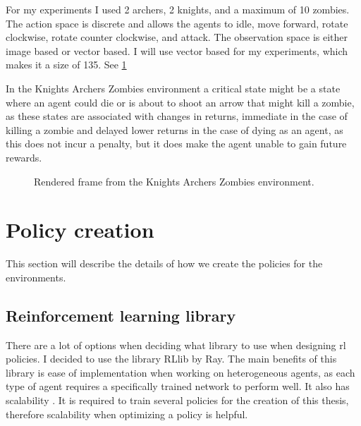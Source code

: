 \documentclass[UKenglish]{uiomasterthesis}
\begin{document}
For my experiments I used 2 archers, 2 knights, and a maximum of 10 zombies. The action space is discrete and allows the agents to idle, move forward, rotate clockwise, rotate counter clockwise, and attack. The observation space is either image based or vector based. I will use vector based for my experiments, which makes it a size of 135. See \cref{fig:kaz_env}

In the Knights Archers Zombies environment a critical state might be a state where an agent could die or is about to shoot an arrow that might kill a zombie, as these states are associated with changes in returns, immediate in the case of killing a zombie and delayed lower returns in the case of dying as an agent, as this does not incur a penalty, but it does make the agent unable to gain future rewards.

\begin{figure}[H]
    \centering
    \caption{Rendered frame from the Knights Archers Zombies environment.}
    \label{fig:kaz_env}
\end{figure}

\section{Policy creation}
This section will describe the details of how we create the policies for the environments.

\subsection{Reinforcement learning library}
There are a lot of options when deciding what library to use when designing \ac{rl} policies. I decided to use the library RLlib by Ray. The main benefits of this library is ease of implementation when working on heterogeneous agents, as each type of agent requires a specifically trained network to perform well. It also has scalability \cite{rayrllib}. It is required to train several policies for the creation of this thesis, therefore scalability when optimizing a policy is helpful.
\end{document}
